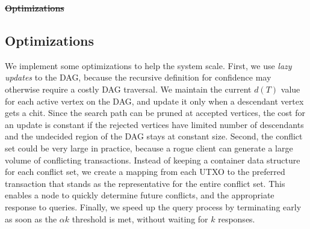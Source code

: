 \documentclass[letterpaper,twocolumn,10pt]{article}
\newcommand{\tronly}[2]{#1}
\newcommand{\editremove}[1]{{\color{red}\sout{#1}}}
\newcommand{\editinsert}[1]{{\color{blue}#1}}
\theoremstyle{definition}
\begin{document}
%
%
%

\tronly{
\noindent
\editremove{\textbf{Optimizations}}
\editinsert{%
\subsection{Optimizations}}
We implement some optimizations to help the system scale.
First, we use \emph{lazy updates} to the DAG, because the recursive definition for confidence may otherwise require a costly DAG traversal.
We maintain the current $d(T)$ value for each active vertex on the DAG, and update it only when a descendant vertex gets a chit.
Since the search path can be pruned at accepted vertices, the cost for an update is constant if the rejected vertices have limited number of descendants and the undecided region of
the DAG stays at constant size.
Second, the conflict set could be very large in practice, because a rogue client can generate a large volume of conflicting transactions.
Instead of keeping a container data structure for each conflict set, we create a mapping from each UTXO to the preferred transaction that stands as the representative for the entire conflict set.
This enables a node to quickly determine future conflicts, and the appropriate response to queries.
Finally, we speed up the query process by terminating early as soon as the $\alpha k$ threshold is met, without waiting for $k$ responses.
}{}
\end{document}
